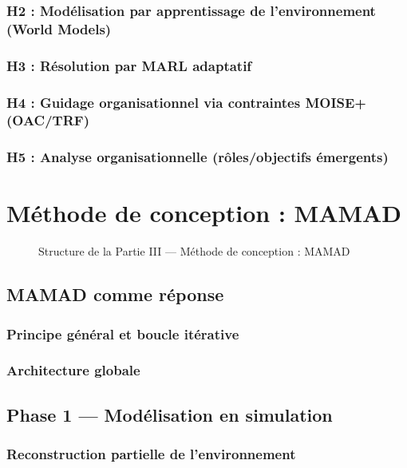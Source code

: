 \documentclass[ twoside,openright,titlepage,numbers=noenddot,headinclude,%
                footinclude=true,cleardoublepage=empty,abstractoff, %
                BCOR=5mm,paper=a4,fontsize=11pt,%
                french,american,%
                ]{scrreprt}
\begin{document}
\section{H2 : Modélisation par apprentissage de l’environnement (World Models)}
\section{H3 : Résolution par MARL adaptatif}
\section{H4 : Guidage organisationnel via contraintes MOISE+ (OAC/TRF)}
\section{H5 : Analyse organisationnelle (rôles/objectifs émergents)}

\part{Méthode de conception : MAMAD}

\begin{figure}[h!]
\centering

\caption{Structure de la Partie III — Méthode de conception : MAMAD}
\end{figure}

\chapter{MAMAD comme réponse}

\section{Principe général et boucle itérative}

\section{Architecture globale}

\chapter{Phase 1 — Modélisation en simulation}
\section{Reconstruction partielle de l’environnement}
\end{document}
